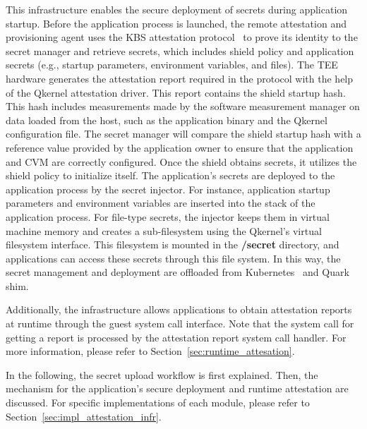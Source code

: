This infrastructure enables the secure deployment of secrets during application startup. Before the application process is launched, the remote attestation and provisioning agent uses the KBS attestation protocol~\cite*{kbs_Attestation_protocol} to prove its identity to the secret manager and retrieve secrets, which includes shield policy and application 
secrets (e.g., startup parameters, environment variables, and files). The TEE hardware generates the attestation report required in the protocol with the help of the Qkernel attestation driver. This report contains the shield startup hash. This hash includes measurements made by the software measurement manager on data loaded from the host, such as 
the application binary and the Qkernel configuration file. The secret manager will compare the shield startup hash with a reference value provided by the application owner to ensure that the application and CVM are correctly configured. Once the shield obtains secrets, it utilizes the shield policy to initialize itself. The application’s secrets are 
deployed to the application process by the secret injector. For instance, application startup parameters and environment variables are inserted into the stack of the application process. For file-type secrets, the injector keeps them in virtual machine memory and creates a sub-filesystem using the Qkernel’s virtual filesystem interface. This filesystem is 
mounted in the \textbf{/secret} directory, and applications can access these secrets through this file system. In this way, the secret management and deployment are offloaded from Kubernetes~\cite*{k8s} and Quark shim.


Additionally, the infrastructure allows applications to obtain attestation reports at runtime through the guest system call interface. Note that the system call for getting a report is processed by the attestation report system call handler. For more information, please refer to Section~\ref{sec:runtime_attesation}.

In the following, the secret upload workflow is first explained. Then, the mechanism for the application’s secure deployment and runtime attestation are discussed. For specific implementations of each module, please refer to Section~\ref{sec:impl_attestation_infr}.



